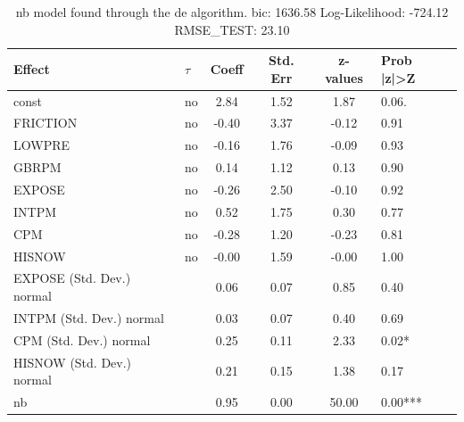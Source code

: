 \begin{table}
	\caption{nb model found through the de algorithm. bic: 1636.58 Log-Likelihood: -724.12 RMSE_TEST: 23.10}
	\begin{center}
		\begin{tabular}{|l|l|c|c|c|l|}
			\hline
			Effect & $\tau$ & Coeff & Std. Err & z-values & Prob |z|>Z \\
			\hline
			const & no & 2.84 & 1.52 & 1.87 & 0.06. \\
			\hline
			FRICTION & no & -0.40 & 3.37 & -0.12 & 0.91 \\
			\hline
			LOWPRE & no & -0.16 & 1.76 & -0.09 & 0.93 \\
			\hline
			GBRPM & no & 0.14 & 1.12 & 0.13 & 0.90 \\
			\hline
			EXPOSE & no & -0.26 & 2.50 & -0.10 & 0.92 \\
			\hline
			INTPM & no & 0.52 & 1.75 & 0.30 & 0.77 \\
			\hline
			CPM & no & -0.28 & 1.20 & -0.23 & 0.81 \\
			\hline
			HISNOW & no & -0.00 & 1.59 & -0.00 & 1.00 \\
			\hline
			EXPOSE (Std. Dev.) normal &  & 0.06 & 0.07 & 0.85 & 0.40 \\
			\hline
			INTPM (Std. Dev.) normal &  & 0.03 & 0.07 & 0.40 & 0.69 \\
			\hline
			CPM (Std. Dev.) normal &  & 0.25 & 0.11 & 2.33 & 0.02* \\
			\hline
			HISNOW (Std. Dev.) normal &  & 0.21 & 0.15 & 1.38 & 0.17 \\
			\hline
			nb &  & 0.95 & 0.00 & 50.00 & 0.00*** \\
			\hline
		\end{tabular}
	\end{center}
\end{table}